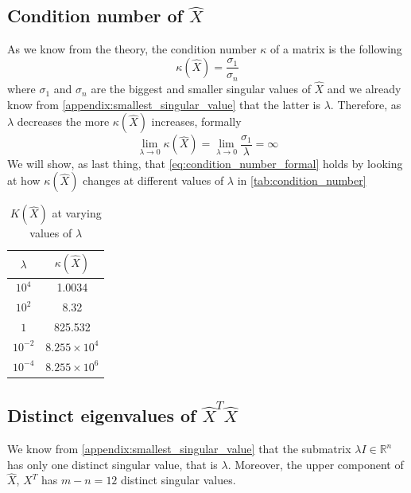 \subsection{Condition number of \texorpdfstring{$\hat{X}$}{{}}}\label{appendix:condition_number}
As we know from the theory, the condition number $\kappa$ of a matrix is the following
\begin{equation}
    \kappa(\hat{X}) = \frac{\sigma_1}{\sigma_n}
    \label{eq:condition_number}
\end{equation}
where $\sigma_1$ and $\sigma_n$ are the biggest and smaller singular values of $\hat{X}$ and we already know from \ref{appendix:smallest_singular_value} that the latter is $\lambda$. Therefore, as $\lambda$ decreases the more $\kappa(\hat{X})$ increases, formally
\begin{equation}
    \lim_{\lambda \rightarrow 0} \kappa(\hat{X}) = \lim_{\lambda \rightarrow 0} \frac{\sigma_1}{\lambda} = \infty
    \label{eq:condition_number_formal}
\end{equation}
We will show, as last thing, that \eqref{eq:condition_number_formal} holds by looking at how $\kappa(\hat{X})$ changes at different values of $\lambda$ in \autoref{tab:condition_number}
\begin{table}[H]
\centering
\begin{tabular}{c|c}
    \hline \hline
    $\lambda$ & $\kappa(\hat{X})$ \\ \hline \hline
    $10^4$ & 1.0034 \\
    $10^2$ & 8.32 \\
    $1$ & 825.532 \\ 
    $10^{-2}$ & $8.255 \times 10^{4}$ \\
    $10^{-4}$ & $8.255 \times 10^{6}$ \\
    \hline
\end{tabular}
\caption{$K(\hat{X})$ at varying values of $\lambda$}
\label{tab:condition_number}
\end{table}

\subsection{Distinct eigenvalues of \texorpdfstring{$\hat{X}^T\hat{X}$}{{}}}\label{appendix:eigenvalues_singular_values}
We know from \ref{appendix:smallest_singular_value} that the submatrix $\lambda I \in \mathbb{R}^n$ has only one distinct singular value, that is $\lambda$. Moreover, the upper component of $\hat{X}$, $X^T$ has $m-n=12$ distinct singular values.
\vspace{3mm}

